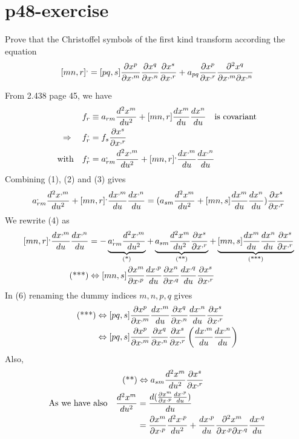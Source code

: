 \section{p48-exercise }
\begin{tcolorbox}
Prove that the Christoffel symbols of the first kind transform according the equation 
$$[mn,r]^, =  [pq,s]\pdv{x^p}{x^{,m}} \pdv{x^q}{x^{,n}}\pdv{x^s}{x^{,r}}+ a_{pq}\pdv{x^p}{x^{,r}}\pdv{x^q}{x^{,m}}{x^{,n}}$$
\end{tcolorbox}
From 2.438 page 45, we have
\begin{align}
\ f_r &\equiv a_{rm}\dv[2]{x^m}{u} +[mn,r]\dv{x^m}{u}\dv{x^n}{u} \quad\text{is covariant} \\
\Rightarrow\quad f_r^, &= f_s\pdv{x^s}{x^{,r}}\\
\text{with}\quad f_r^, &= a^,_{rm}\dv[2]{x^{,m}}{u} +[mn,r]^, \dv{x^{,m}}{u}\dv{x^{,n}}{u}
\end{align}
Combining (1), (2) and (3) gives 
\begin{align}
\ a^,_{rm}\dv[2]{x^{,m}}{u} +[mn,r]^, \dv{x^{,m}}{u}\dv{x^{,n}}{u} = ( a_{sm}\dv[2]{x^m}{u} +[mn,s]\dv{x^m}{u}\dv{x^n}{u})\pdv{x^s}{x^{,r}}
\end{align}
We rewrite (4) as 
\begin{align}
\ [mn,r]^, \dv{x^{,m}}{u}\dv{x^{,n}}{u} &= -\underbrace{a^,_{rm}\dv[2]{x^{,m}}{u}}_\text{(*)} +\underbrace{ a_{sm}\dv[2]{x^m}{u}\pdv{x^s}{x^{,r}}}_\text{(**)} +\underbrace{[mn,s]\dv{x^m}{u}\dv{x^n}{u}\pdv{x^s}{x^{,r}}}_\text{(***)}\\
\text{(***)} &\Leftrightarrow [mn,s]\pdv{x^m}{x^{,p}}\dv{x^{,p}}{u}\pdv{x^n}{x^{,q}}\dv{x^{,q}}{u}\pdv{x^s}{x^{,r}}
\end{align}
In (6) renaming the dummy indices $m,n,p,q$ gives
\begin{align}
\text{(***)} &\Leftrightarrow [pq,s]\pdv{x^p}{x^{,m}}\dv{x^{,m}}{u}\pdv{x^q}{x^{,n}}\dv{x^{,n}}{u}\pdv{x^s}{x^{,r}}\\
&\Leftrightarrow [pq,s]\pdv{x^p}{x^{,m}}\pdv{x^q}{x^{,n}}\pdv{x^s}{x^{,r}}\left(\dv{x^{,m}}{u}\dv{x^{,n}}{u}\right)
\end{align}
Also,
\begin{align}
\text{(**)} &\Leftrightarrow  a_{sm}\dv[2]{x^m}{u}\pdv{x^s}{x^{,r}}\\
\text{As we have also}\quad \dv[2]{x^m}{u} &= \dv{(\pdv{x^m}{x^{,p}}\dv{x^{,p}}{u})}{u}\\
&= \pdv{x^m}{x^{,p}}\dv[2]{x^{,p}}{u}+\dv{x^{,p}}{u}\pdv{x^m}{x^{,p}}{x^{,q}}\dv{x^{,q}}{u} 
\end{align}
